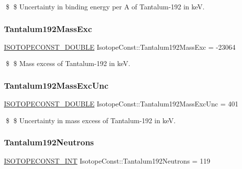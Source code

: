 \$ \$ Uncertainty in binding energy per A of Tantalum-\/192 in keV. \mbox{\label{group___isotope_const-_tantalum-_ta192_gaf80206db9a2f3fcec650f12a20aabd13}} 
\subsubsection{\texorpdfstring{Tantalum192\+Mass\+Exc}{Tantalum192MassExc}}
{\footnotesize\ttfamily \mbox{\hyperlink{group___isotope_const-_macros_ga8f45a7272ce02c0b4c65c44636ed719a}{I\+S\+O\+T\+O\+P\+E\+C\+O\+N\+S\+T\+\_\+\+D\+O\+U\+B\+LE}} Isotope\+Const\+::\+Tantalum192\+Mass\+Exc = -\/23064}

\$ \$ Mass excess of Tantalum-\/192 in keV. \mbox{\label{group___isotope_const-_tantalum-_ta192_ga047527e85b1acd908b9f1a509d77a5dd}} 
\subsubsection{\texorpdfstring{Tantalum192\+Mass\+Exc\+Unc}{Tantalum192MassExcUnc}}
{\footnotesize\ttfamily \mbox{\hyperlink{group___isotope_const-_macros_ga8f45a7272ce02c0b4c65c44636ed719a}{I\+S\+O\+T\+O\+P\+E\+C\+O\+N\+S\+T\+\_\+\+D\+O\+U\+B\+LE}} Isotope\+Const\+::\+Tantalum192\+Mass\+Exc\+Unc = 401}

\$ \$ Uncertainty in mass excess of Tantalum-\/192 in keV. \mbox{\label{group___isotope_const-_tantalum-_ta192_ga0fbcc2980ca84fd24e5a422761e48def}} 
\subsubsection{\texorpdfstring{Tantalum192\+Neutrons}{Tantalum192Neutrons}}
{\footnotesize\ttfamily \mbox{\hyperlink{group___isotope_const-_macros_ga5f18360b3e99483a35c32d789e62621c}{I\+S\+O\+T\+O\+P\+E\+C\+O\+N\+S\+T\+\_\+\+I\+NT}} Isotope\+Const\+::\+Tantalum192\+Neutrons = 119}

